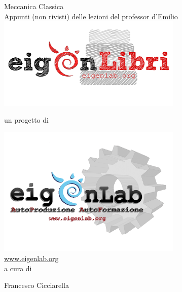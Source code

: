 \documentclass[12pt]{report}
\theoremstyle{plain}
\theoremstyle{definition}
\theoremstyle{remark}
\numberwithin{equation}{section}
\begin{document}
\begin{titlepage}
\centering
{\Huge Meccanica Classica}\\
\vspace*{0.5cm}
{\small Appunti (non rivisti) delle lezioni del professor d'Emilio}
 \\
\includegraphics[width=250pt,keepaspectratio=true]{Addons/eigenLibrichiaro}
\begin{center}
un progetto di
\end{center}
\includegraphics[width=250pt,keepaspectratio=true]{Addons/eigenlabinvertito2.png} \\
\url{www.eigenlab.org}
 \\
{\small a cura di}\\
\vspace*{0.5cm}
{\normalsize Francesco Cicciarella\par}
\end{titlepage}
\pagebreak
\end{document}
